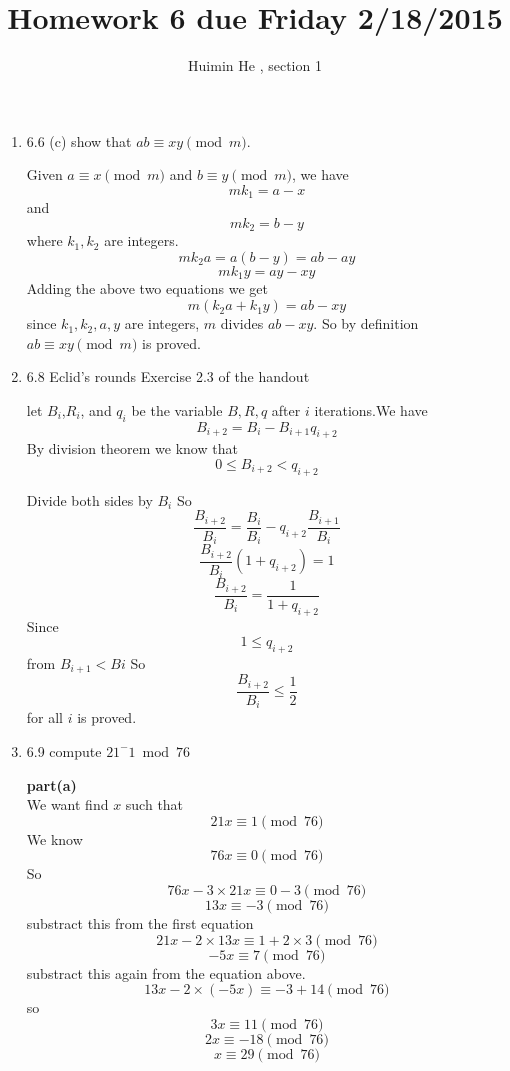 \documentclass[11pt]{article}
\title{Homework 6 due Friday 2/18/2015}
\author{Huimin He , section 1}
\begin{document}
\maketitle

\def\bfor{\textbf{for}}
\def\bdo{\textbf{do}}
\def\bwhile{\textbf{while}}
\def\bend{\textbf{end}}
\def\bif{\textbf{if}}
\def\bthen{\textbf{then}}
\def\belse{\textbf{else}}
\def\breturn{\textbf{return}}
\def\bexit{\textbf{exit}}
\def\bprint{\textbf{print}}

\begin{enumerate}
\item 6.6 (c) show that $ab\equiv xy \pmod{m}$.

Given $a \equiv x \pmod{m}$ and $b \equiv y \pmod{m}$, we have
\[ mk_1 = a-x\] and \[mk_2 = b-y\] where $k_1,k_2$ are integers.
\[mk_{2}a=a(b-y)=ab-ay\]
\[mk_{1}y=ay-xy\]
Adding the above two equations we get
\[m(k_{2}a+k_{1}y) = ab -xy\]
since $k_1,k_2,a,y$ are integers, $m$ divides $ab-xy$. So by definition
$ab \equiv xy \pmod{m}$ is proved.
\\

\item 6.8 Eclid's rounds Exercise 2.3 of the handout

let $B_i$,$R_i$, and $q_i$ be the variable $B,R,q$ after $i$ iterations.We have \[B_{i+2} = B_i - B_{i+1}q_{i+2}\]
By division theorem we know that \[0 \leq B_{i+2} < q_{i+2}\]

Divide both sides by $B_i$
So \[ \frac{B_{i+2}}{B_i} = \frac{B_i}{B_i} - q_{i+2}\frac{B_{i+1}}{B_i}\]
\[\frac{B_{i+2}}{B_i}(1+q_{i+2}) = 1\]
\[\frac{B_{i+2}}{B_i} = \frac{1}{1+q_{i+2}}\]
Since \[ 1 \leq q_{i+2}\] from $B_{i+1} < B{i}$
So \[\frac{B_{i+2}}{B_i} \leq \frac{1}{2}\] for all $i$ is proved. 

\item 6.9 compute $21^-1 \bmod{76}$

\textbf{part(a)}\\
We want find $x$ such that \[21x \equiv 1 \pmod{76}\]
We know \[76x \equiv 0 \pmod{76}\]
So \[76x-3\times21x \equiv 0-3 \pmod{76}\]
\[13x \equiv -3 \pmod{76}\]
substract this from the first equation
\[ 21x -2\times13x \equiv 1+2\times3 \pmod{76}\]
\[-5x \equiv 7 \pmod{76}\] substract this again from the equation above.
\[13x-2\times(-5x) \equiv -3+14 \pmod{76}\]
so \[3x \equiv 11 \pmod{76}\]
\[2x \equiv -18 \pmod{76}\]
\[x \equiv 29 \pmod{76}\]


\end{enumerate}
\end{document}
